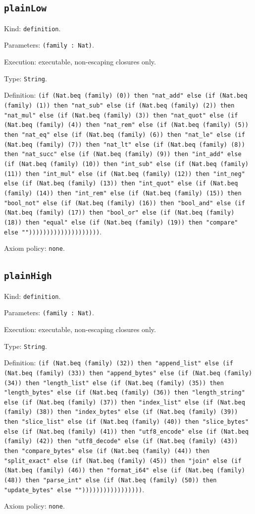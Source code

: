 \documentclass[11pt]{article}
\begin{document}
\subsection*{\texttt{plainLow}}
\noindent Kind: \texttt{definition}.\par
\noindent Parameters: \texttt{(family : Nat)}.\par
\noindent Execution: executable, non-escaping closures only.\par
\noindent Type: \texttt{String}.\par
\noindent Definition: \texttt{(if (Nat.beq (family) (0)) then "nat\_add" else (if (Nat.beq (family) (1)) then "nat\_sub" else (if (Nat.beq (family) (2)) then "nat\_mul" else (if (Nat.beq (family) (3)) then "nat\_quot" else (if (Nat.beq (family) (4)) then "nat\_rem" else (if (Nat.beq (family) (5)) then "nat\_eq" else (if (Nat.beq (family) (6)) then "nat\_le" else (if (Nat.beq (family) (7)) then "nat\_lt" else (if (Nat.beq (family) (8)) then "nat\_succ" else (if (Nat.beq (family) (9)) then "int\_add" else (if (Nat.beq (family) (10)) then "int\_sub" else (if (Nat.beq (family) (11)) then "int\_mul" else (if (Nat.beq (family) (12)) then "int\_neg" else (if (Nat.beq (family) (13)) then "int\_quot" else (if (Nat.beq (family) (14)) then "int\_rem" else (if (Nat.beq (family) (15)) then "bool\_not" else (if (Nat.beq (family) (16)) then "bool\_and" else (if (Nat.beq (family) (17)) then "bool\_or" else (if (Nat.beq (family) (18)) then "equal" else (if (Nat.beq (family) (19)) then "compare" else ""))))))))))))))))))))}.\par
\noindent Axiom policy: \texttt{none}.\par
\subsection*{\texttt{plainHigh}}
\noindent Kind: \texttt{definition}.\par
\noindent Parameters: \texttt{(family : Nat)}.\par
\noindent Execution: executable, non-escaping closures only.\par
\noindent Type: \texttt{String}.\par
\noindent Definition: \texttt{(if (Nat.beq (family) (32)) then "append\_list" else (if (Nat.beq (family) (33)) then "append\_bytes" else (if (Nat.beq (family) (34)) then "length\_list" else (if (Nat.beq (family) (35)) then "length\_bytes" else (if (Nat.beq (family) (36)) then "length\_string" else (if (Nat.beq (family) (37)) then "index\_list" else (if (Nat.beq (family) (38)) then "index\_bytes" else (if (Nat.beq (family) (39)) then "slice\_list" else (if (Nat.beq (family) (40)) then "slice\_bytes" else (if (Nat.beq (family) (41)) then "utf8\_encode" else (if (Nat.beq (family) (42)) then "utf8\_decode" else (if (Nat.beq (family) (43)) then "compare\_bytes" else (if (Nat.beq (family) (44)) then "split\_exact" else (if (Nat.beq (family) (45)) then "join" else (if (Nat.beq (family) (46)) then "format\_i64" else (if (Nat.beq (family) (48)) then "parse\_int" else (if (Nat.beq (family) (50)) then "update\_bytes" else "")))))))))))))))))}.\par
\noindent Axiom policy: \texttt{none}.\par
\end{document}
